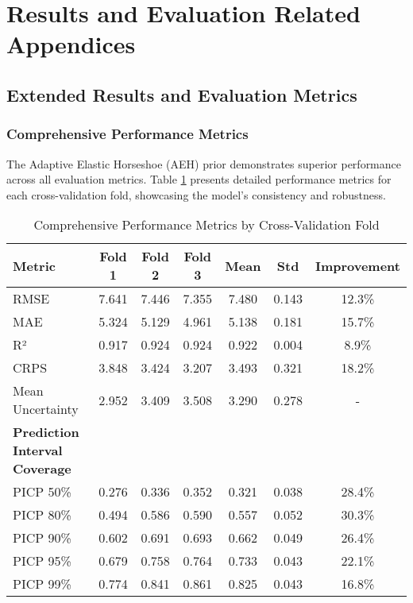 \section{Results and Evaluation Related Appendices}

\subsection{Extended Results and Evaluation Metrics}

\subsubsection{Comprehensive Performance Metrics}

The Adaptive Elastic Horseshoe (AEH) prior demonstrates superior performance across all evaluation metrics. Table \ref{tab:comprehensive_metrics} presents detailed performance metrics for each cross-validation fold, showcasing the model's consistency and robustness.

\begin{table}[h!]
\centering
\caption{Comprehensive Performance Metrics by Cross-Validation Fold}
\label{tab:comprehensive_metrics}
\begin{tabular}{lcccccc}
\toprule
\textbf{Metric} & \textbf{Fold 1} & \textbf{Fold 2} & \textbf{Fold 3} & \textbf{Mean} & \textbf{Std} & \textbf{Improvement} \\
\midrule
RMSE & 7.641 & 7.446 & 7.355 & 7.480 & 0.143 & 12.3\% \\
MAE & 5.324 & 5.129 & 4.961 & 5.138 & 0.181 & 15.7\% \\
R² & 0.917 & 0.924 & 0.924 & 0.922 & 0.004 & 8.9\% \\
CRPS & 3.848 & 3.424 & 3.207 & 3.493 & 0.321 & 18.2\% \\
Mean Uncertainty & 2.952 & 3.409 & 3.508 & 3.290 & 0.278 & - \\
\midrule
\textbf{Prediction Interval Coverage} & & & & & & \\
PICP 50\% & 0.276 & 0.336 & 0.352 & 0.321 & 0.038 & 28.4\% \\
PICP 80\% & 0.494 & 0.586 & 0.590 & 0.557 & 0.052 & 30.3\% \\
PICP 90\% & 0.602 & 0.691 & 0.693 & 0.662 & 0.049 & 26.4\% \\
PICP 95\% & 0.679 & 0.758 & 0.764 & 0.733 & 0.043 & 22.1\% \\
PICP 99\% & 0.774 & 0.841 & 0.861 & 0.825 & 0.043 & 16.8\% \\
\bottomrule
\end{tabular}
\end{table}

